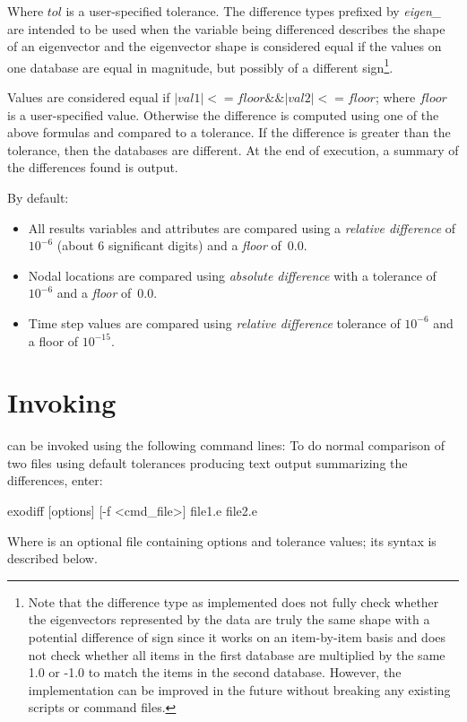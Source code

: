 Where $tol$ is a user-specified tolerance. The difference types
prefixed by {\em eigen\_} are intended to be used when the variable
being differenced describes the shape of an eigenvector and the
eigenvector shape is considered equal if the values on one database
are equal in magnitude, but possibly of a different sign\footnote{Note
that the difference type as implemented does not fully check whether
the eigenvectors represented by the data are truly the same shape with
a potential difference of sign since it works on an item-by-item basis and
does not check whether all items in the first database are multiplied
by the same 1.0 or -1.0 to match the items in the second database.
However, the implementation can be improved in the future without
breaking any existing scripts or command files.}.

Values are considered equal if $|val1| <= floor \&\& |val2| <= floor$;
where $floor$ is a user-specified value. Otherwise the difference is
computed using one of the above formulas and compared to a tolerance.
If the difference is greater than the tolerance, then the databases
are different.  At the end of execution, a summary of the differences
found is output.

By default:
\begin{itemize}
\item All results variables and attributes are compared using a {\em relative difference} of $10^{-6}$
(about 6 significant digits) and a {\em floor} of~0.0.
\item Nodal locations are compared using {\em absolute difference} with
a tolerance of $10^{-6}$ and a {\em floor} of~0.0.
\item Time step values are compared using {\em relative difference} tolerance of $10^{-6}$ and a floor of $10^{-15}$.
\end{itemize}

\section{Invoking \exodiff}
\exodiff{} can be invoked using the following command lines:
To do normal comparison of two files using default tolerances
producing text output summarizing the differences, enter:
\begin{syntax}
     exodiff [{options}] [-f <cmd\_file>] file1.e file2.e
\end{syntax}
Where  is an optional file containing options and
tolerance values; its syntax is described below.

